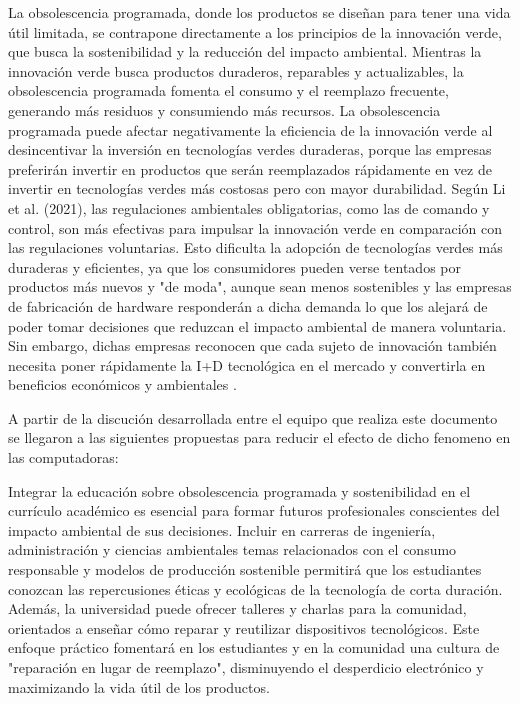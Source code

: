 \documentclass[10pt,journal,compsoc]{IEEEtran}
\begin{document}
La obsolescencia programada, donde los productos se diseñan para tener una vida útil limitada, se contrapone directamente a los principios de la innovación verde, que busca la sostenibilidad y la reducción del impacto ambiental. Mientras la innovación verde busca productos duraderos, reparables y actualizables, la obsolescencia programada fomenta el consumo y el reemplazo frecuente, generando más residuos y consumiendo más recursos. La obsolescencia programada puede afectar negativamente la eficiencia de la innovación verde al desincentivar la inversión en tecnologías verdes duraderas, porque las empresas preferirán invertir en productos que serán reemplazados rápidamente en vez de invertir en tecnologías verdes más costosas pero con mayor durabilidad.  Según Li et al. (2021), las regulaciones ambientales obligatorias, como las de comando y control, son más efectivas para impulsar la innovación verde en comparación con las regulaciones voluntarias. Esto dificulta la adopción de tecnologías verdes más duraderas y eficientes, ya que los consumidores pueden verse tentados por productos más nuevos y "de moda", aunque sean menos sostenibles y las empresas de fabricación de hardware responderán a dicha demanda lo que los alejará de poder tomar decisiones que reduzcan el impacto ambiental de manera voluntaria. Sin embargo, dichas empresas reconocen que cada sujeto de innovación también necesita poner rápidamente la I+D tecnológica en el mercado y convertirla en beneficios económicos y ambientales \cite{li2021different}. 

A partir de la discución desarrollada entre el equipo que realiza este documento se llegaron a las siguientes propuestas para reducir el efecto de dicho fenomeno en las computadoras:

Integrar la educación sobre obsolescencia programada y sostenibilidad en el currículo académico es esencial para formar futuros profesionales conscientes del impacto ambiental de sus decisiones. Incluir en carreras de ingeniería, administración y ciencias ambientales temas relacionados con el consumo responsable y modelos de producción sostenible permitirá que los estudiantes conozcan las repercusiones éticas y ecológicas de la tecnología de corta duración. Además, la universidad puede ofrecer talleres y charlas para la comunidad, orientados a enseñar cómo reparar y reutilizar dispositivos tecnológicos. Este enfoque práctico fomentará en los estudiantes y en la comunidad una cultura de "reparación en lugar de reemplazo", disminuyendo el desperdicio electrónico y maximizando la vida útil de los productos.
\end{document}
